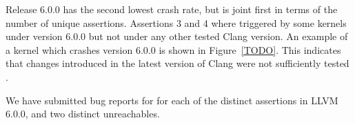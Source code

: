 Release 6.0.0 has the second lowest crash rate, but is joint first in terms of the number of unique assertions. Assertions 3 and 4 where triggered by some kernels under version 6.0.0 but not under any other tested Clang version. An example of a kernel which crashes version 6.0.0 is shown in Figure~\ref{TODO}. This indicates that changes introduced in the latest version of Clang were not sufficiently tested .

We have submitted bug reports for for each of the distinct assertions in LLVM 6.0.0, and two distinct unreachables.
